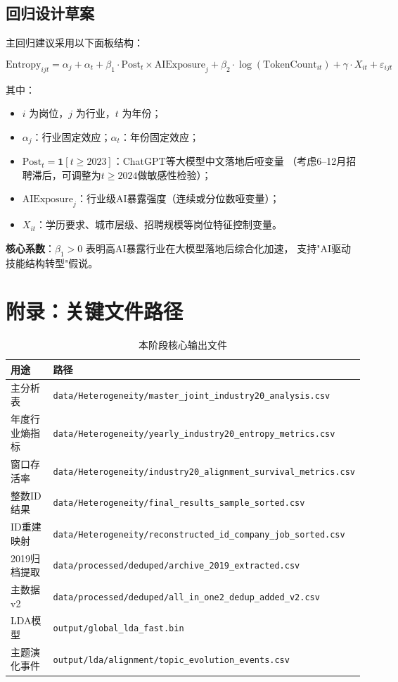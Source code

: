 \documentclass[12pt,a4paper]{ctexart}
\begin{document}
\subsection{回归设计草案}

主回归建议采用以下面板结构：

\begin{equation}
\text{Entropy}_{ijt} = \alpha_j + \alpha_t + \beta_1 \cdot \text{Post}_{t} \times \text{AIExposure}_j + \beta_2 \cdot \log(\text{TokenCount}_{it}) + \gamma \cdot X_{it} + \varepsilon_{ijt}
\end{equation}

其中：
\begin{itemize}
    \item $i$ 为岗位，$j$ 为行业，$t$ 为年份；
    \item $\alpha_j$：行业固定效应；$\alpha_t$：年份固定效应；
    \item $\text{Post}_t = \mathbf{1}[t \geq 2023]$：ChatGPT等大模型中文落地后哑变量
    （考虑6--12月招聘滞后，可调整为$t \geq 2024$做敏感性检验）；
    \item $\text{AIExposure}_j$：行业级AI暴露强度（连续或分位数哑变量）；
    \item $X_{it}$：学历要求、城市层级、招聘规模等岗位特征控制变量。
\end{itemize}

\textbf{核心系数}：$\beta_1 > 0$ 表明高AI暴露行业在大模型落地后综合化加速，
支持"AI驱动技能结构转型"假说。

\section{附录：关键文件路径}

\begin{table}[H]
\centering
\caption{本阶段核心输出文件}
\begin{tabular}{ll}
\toprule
用途 & 路径 \\
\midrule
主分析表 & \texttt{data/Heterogeneity/master\_joint\_industry20\_analysis.csv} \\
年度行业熵指标 & \texttt{data/Heterogeneity/yearly\_industry20\_entropy\_metrics.csv} \\
窗口存活率 & \texttt{data/Heterogeneity/industry20\_alignment\_survival\_metrics.csv} \\
整数ID结果 & \texttt{data/Heterogeneity/final\_results\_sample\_sorted.csv} \\
ID重建映射 & \texttt{data/Heterogeneity/reconstructed\_id\_company\_job\_sorted.csv} \\
2019归档提取 & \texttt{data/processed/deduped/archive\_2019\_extracted.csv} \\
主数据v2 & \texttt{data/processed/deduped/all\_in\_one2\_dedup\_added\_v2.csv} \\
LDA模型 & \texttt{output/global\_lda\_fast.bin} \\
主题演化事件 & \texttt{output/lda/alignment/topic\_evolution\_events.csv} \\
\bottomrule
\end{tabular}
\end{table}
\end{document}
